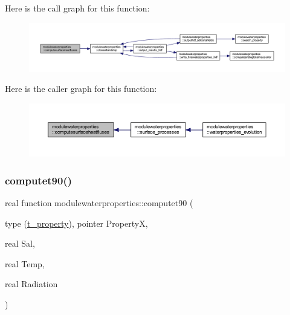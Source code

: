 Here is the call graph for this function\+:\nopagebreak
\begin{figure}[H]
\begin{center}
\leavevmode
\includegraphics[width=350pt]{namespacemodulewaterproperties_a772748e5406dcfadf1087f66a9622a83_cgraph}
\end{center}
\end{figure}
Here is the caller graph for this function\+:\nopagebreak
\begin{figure}[H]
\begin{center}
\leavevmode
\includegraphics[width=350pt]{namespacemodulewaterproperties_a772748e5406dcfadf1087f66a9622a83_icgraph}
\end{center}
\end{figure}
\mbox{\label{namespacemodulewaterproperties_a5dbf64b0ab9b6e7fc74c9425dd2e5801}} 
\subsubsection{\texorpdfstring{computet90()}{computet90()}}
{\footnotesize\ttfamily real function modulewaterproperties\+::computet90 (\begin{DoxyParamCaption}\item[{type (\mbox{\hyperlink{structmodulewaterproperties_1_1t__property}{t\+\_\+property}}), pointer}]{PropertyX,  }\item[{real}]{Sal,  }\item[{real}]{Temp,  }\item[{real}]{Radiation }\end{DoxyParamCaption})\hspace{0.3cm}{\ttfamily [private]}}

